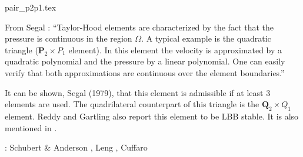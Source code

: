 \begin{flushright} {\tiny {\color{gray} pair\_p2p1.tex}} \end{flushright}

\noindent
\begin{minipage}{0.54\textwidth}
From Segal \cite{segal}: ``Taylor-Hood elements \cite{taho73} 
are characterized by the fact that the pressure is continuous in the region $\Omega$. 
A typical example is the quadratic triangle (${\bm P}_2\times P_1$ element).
In this element the velocity is approximated by a quadratic polynomial and the pressure by a
linear polynomial. One can easily verify that both approximations are continuous over 
the element boundaries.''

It can be shown, Segal (1979), that this element is admissible if at least 3 elements 
are used. The quadrilateral counterpart of this triangle is the ${\bm Q}_2\times Q_1$ element.
Reddy and Gartling \cite[p179]{reddybook2} also report this element to be LBB stable.
It is also mentioned in \textcite{nath93}.

\Literature: Schubert \& Anderson \cite{scan85}, Leng \etal \cite{lejx14}, Cuffaro \etal \cite{cump20}
\end{minipage}
\hfill
\begin{minipage}{0.42\textwidth}
\begin{center}

\end{center}
\end{minipage}




